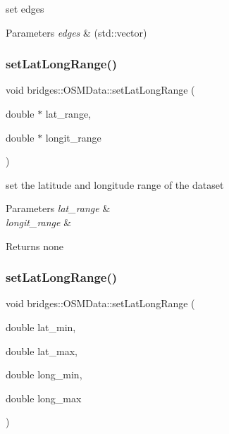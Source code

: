 set edges


\begin{DoxyParams}{Parameters}
{\em edges} & (std\+::vector) \\
\hline
\end{DoxyParams}
\mbox{\label{classbridges_1_1_o_s_m_data_a75197b6c3de0ada8c69aae3051368d00}} 
\subsubsection{\texorpdfstring{set\+Lat\+Long\+Range()}{setLatLongRange()}\hspace{0.1cm}{\footnotesize\ttfamily [1/2]}}
{\footnotesize\ttfamily void bridges\+::\+O\+S\+M\+Data\+::set\+Lat\+Long\+Range (\begin{DoxyParamCaption}\item[{double $\ast$}]{lat\+\_\+range,  }\item[{double $\ast$}]{longit\+\_\+range }\end{DoxyParamCaption})\hspace{0.3cm}{\ttfamily [inline]}}

set the latitude and longitude range of the dataset


\begin{DoxyParams}{Parameters}
{\em lat\+\_\+range} & \\
\hline
{\em longit\+\_\+range} & \\
\hline
\end{DoxyParams}
\begin{DoxyReturn}{Returns}
none 
\end{DoxyReturn}
\mbox{\label{classbridges_1_1_o_s_m_data_a4ddb01d0735da5e21fd8e33d1d5203ad}} 
\subsubsection{\texorpdfstring{set\+Lat\+Long\+Range()}{setLatLongRange()}\hspace{0.1cm}{\footnotesize\ttfamily [2/2]}}
{\footnotesize\ttfamily void bridges\+::\+O\+S\+M\+Data\+::set\+Lat\+Long\+Range (\begin{DoxyParamCaption}\item[{double}]{lat\+\_\+min,  }\item[{double}]{lat\+\_\+max,  }\item[{double}]{long\+\_\+min,  }\item[{double}]{long\+\_\+max }\end{DoxyParamCaption})\hspace{0.3cm}{\ttfamily [inline]}}

